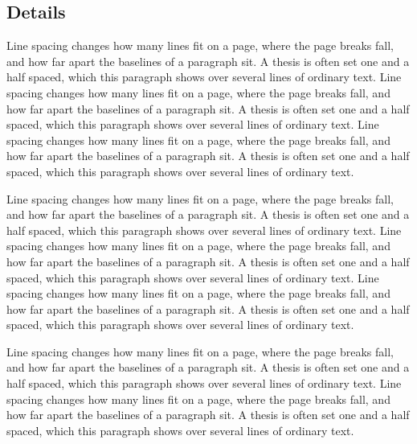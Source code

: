 \subsection{Details}
Line spacing changes how many lines fit on a page, where the page breaks fall, and how far apart the baselines of a paragraph sit. A thesis is often set one and a half spaced, which this paragraph shows over several lines of ordinary text.  {\small Line spacing changes how many lines fit on a page, where the page breaks fall, and how far apart the baselines of a paragraph sit. A thesis is often set one and a half spaced, which this paragraph shows over several lines of ordinary text.} Line spacing changes how many lines fit on a page, where the page breaks fall, and how far apart the baselines of a paragraph sit. A thesis is often set one and a half spaced, which this paragraph shows over several lines of ordinary text.

Line spacing changes how many lines fit on a page, where the page breaks fall, and how far apart the baselines of a paragraph sit. A thesis is often set one and a half spaced, which this paragraph shows over several lines of ordinary text. Line spacing changes how many lines fit on a page, where the page breaks fall, and how far apart the baselines of a paragraph sit. A thesis is often set one and a half spaced, which this paragraph shows over several lines of ordinary text. Line spacing changes how many lines fit on a page, where the page breaks fall, and how far apart the baselines of a paragraph sit. A thesis is often set one and a half spaced, which this paragraph shows over several lines of ordinary text.

Line spacing changes how many lines fit on a page, where the page breaks fall, and how far apart the baselines of a paragraph sit. A thesis is often set one and a half spaced, which this paragraph shows over several lines of ordinary text. Line spacing changes how many lines fit on a page, where the page breaks fall, and how far apart the baselines of a paragraph sit. A thesis is often set one and a half spaced, which this paragraph shows over several lines of ordinary text.

